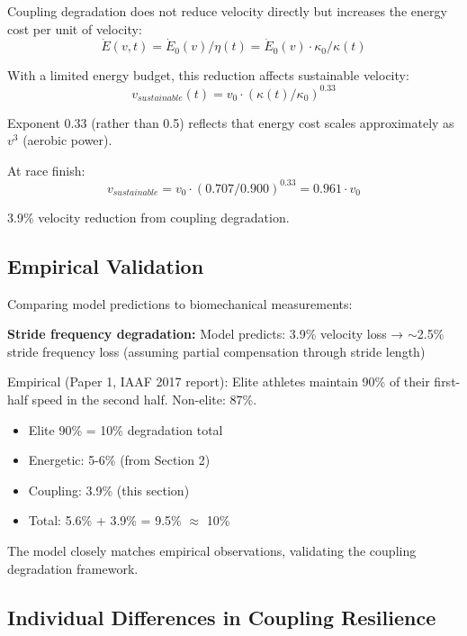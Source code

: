  Coupling degradation does not reduce velocity directly but increases the energy cost per unit of velocity:
\begin{equation}
\dot{E}(v,t) = \dot{E}_0(v) / \eta(t) = \dot{E}_0(v) \cdot \kappa_0 / \kappa(t)
\end{equation}

With a limited energy budget, this reduction affects sustainable velocity:
\begin{equation}
v_{sustainable}(t) = v_0 \cdot (\kappa(t)/\kappa_0)^{0.33}
\end{equation}

Exponent 0.33 (rather than 0.5) reflects that energy cost scales approximately as $v^3$ (aerobic power).

At race finish:
\begin{equation}
v_{sustainable} = v_0 \cdot (0.707/0.900)^{0.33} = 0.961 \cdot v_0
\end{equation}

3.9\% velocity reduction from coupling degradation.

\subsection{Empirical Validation}

Comparing model predictions to biomechanical measurements:

\textbf{Stride frequency degradation:}
Model predicts: 3.9\% velocity loss → $\sim$2.5\% stride frequency loss (assuming partial compensation through stride length)

Empirical (Paper 1, IAAF 2017 report): Elite athletes maintain 90\% of their first-half speed in the second half. Non-elite: 87\%.

\begin{itemize}
    \item Elite 90\% = 10\% degradation total
    \item Energetic: 5-6\% (from Section 2)
    \item Coupling: 3.9\% (this section)
    \item Total: 5.6\% + 3.9\% = 9.5\% $\approx$ 10\% \checkmark
\end{itemize}

The model closely matches empirical observations, validating the coupling degradation framework.

\subsection{Individual Differences in Coupling Resilience}

